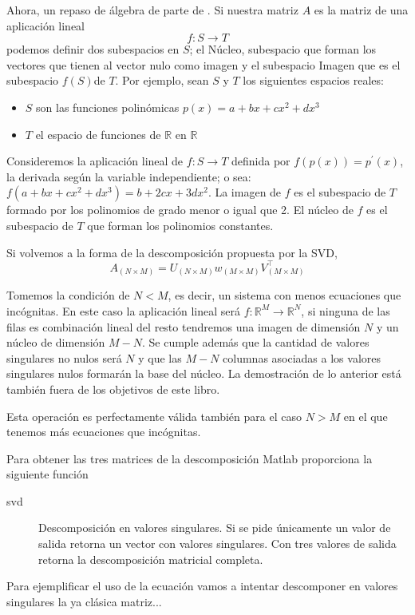 Ahora, un repaso de álgebra de parte de \cite{Algebra}. Si nuestra
matriz $A$ es la matriz de una aplicación lineal \[ f:S\longrightarrow
T\] podemos definir dos subespacios en $S$; el Núcleo, subespacio que
forman los vectores que tienen al vector nulo como imagen y el
subespacio Imagen que es el subespacio $f(S)$de $T$. Por ejemplo, sean
$S$ y $T$ los siguientes espacios reales:

\begin{itemize}
\item $S$ son las funciones polinómicas $p(x)=a+bx+cx^{2}+dx^{3}$
\item $T$ el espacio de funciones de $\mathbb{R}$ en $\mathbb{R}$
\end{itemize}
Consideremos la aplicación lineal de $f:S\longrightarrow T$ definida
por $f(p(x))=p^{\prime}(x)$, la derivada según la variable
independiente; o sea: $f(a+bx+cx^{2}+dx^{3})=b+2cx+3dx^{2}$. La imagen
de $f$ es el subespacio de $T$ formado por los polinomios de grado
menor o igual que 2. El núcleo de $f$ es el subespacio de $T$ que
forman los polinomios constantes.

Si volvemos a la forma de la descomposición propuesta por la SVD,
$$
A_{(N\times M)}=U_{(N\times M)}w_{(M\times M)}V_{(M\times M)}^{\top}$$

Tomemos la condición de $N<M$, es decir, un sistema con menos
ecuaciones que incógnitas. En este caso la aplicación lineal será
$f:\mathbb{R}^{M}\longrightarrow\mathbb{R}^{N}$, si ninguna de las
filas es combinación lineal del resto tendremos una imagen de
dimensión $N$ y un núcleo de dimensión $M-N$. Se cumple además que la
cantidad de valores singulares no nulos será $N$ y que las $M-N$
columnas asociadas a los valores singulares nulos formarán la base del
núcleo. La demostración de lo anterior está también fuera de los
objetivos de este libro.

Esta operación es perfectamente válida también para el caso $N>M$ en
el que tenemos más ecuaciones que incógnitas.

Para obtener las tres matrices de la descomposición Matlab proporciona
la siguiente función

\begin{description}
\item [svd]Descomposición en valores singulares. Si se pide
  únicamente un valor de salida retorna un vector con valores
  singulares.  Con tres valores de salida retorna la descomposición
  matricial completa.
\end{description}
Para ejemplificar el uso de la ecuación vamos a intentar descomponer
en valores singulares la ya clásica matriz...

